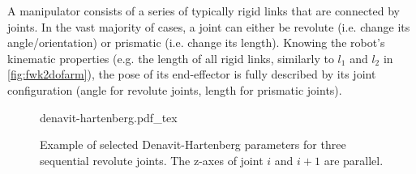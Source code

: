 A manipulator consists of a series of typically rigid links that are connected by joints.
In the vast majority of cases, a joint can either be revolute (i.e. change its angle/orientation) or prismatic (i.e. change its length).
Knowing the robot's kinematic properties (e.g. the length of all rigid links, similarly to $l_1$ and $l_2$ in \cref{fig:fwk2dofarm}), the pose of its end-effector is fully described by its joint configuration (angle for revolute joints, length for prismatic joints).



\begin{figure}[!t]
    \centering
    \def\svgwidth{\textwidth}
    {denavit-hartenberg.pdf_tex}
    \caption{Example of selected Denavit-Hartenberg parameters for three sequential revolute joints. The z-axes of joint $i$ and $i+1$ are parallel.}
    \label{fig:denavit}
\end{figure}

